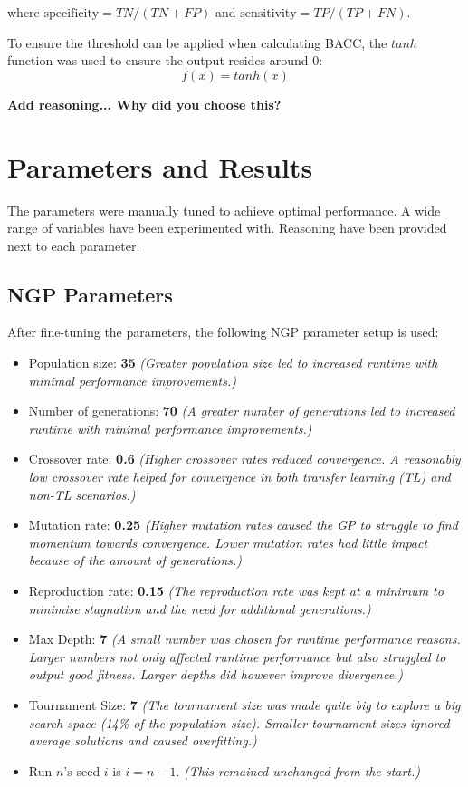 \documentclass{article}
\begin{document}
where \(\mbox{specificity} = TN / (TN + FP)\) and \(\mbox{sensitivity} = TP / (TP + FN)\).

To ensure the threshold can be applied when calculating BACC, the \(tanh\) function was used to ensure the output resides around 0:
\begin{equation}\label{eq:sigmoid}
  f(x) = tanh(x)
\end{equation}

\textbf{Add reasoning... Why did you choose this?}

\section{Parameters and Results}
\label{GPsetup}
The parameters were manually tuned to achieve optimal performance. A wide range of variables have been experimented with. Reasoning have been provided next to each parameter.

\subsection{NGP Parameters}
After fine-tuning the parameters, the following NGP parameter setup is used:
\begin{itemize}
  \item Population size: \textbf{35} \emph{(Greater population size led to increased runtime with minimal performance improvements.)}
  \item Number of generations: \textbf{70} \emph{(A greater number of generations led to increased runtime with minimal performance improvements.)}
  \item Crossover rate: \textbf{0.6} \emph{(Higher crossover rates reduced convergence. A reasonably low crossover rate helped for convergence in both transfer learning (TL) and non-TL scenarios.)}
  \item Mutation rate: \textbf{0.25} \emph{(Higher mutation rates caused the GP to struggle to find momentum towards convergence. Lower mutation rates had little impact because of the amount of generations.)}
  \item Reproduction rate: \textbf{0.15} \emph{(The reproduction rate was kept at a minimum to minimise stagnation and the need for additional generations.)}
  \item Max Depth: \textbf{7} \emph{(A small number was chosen for runtime performance reasons. Larger numbers not only affected runtime performance but also struggled to output good fitness. Larger depths did however improve divergence.)} 
  \item Tournament Size: \textbf{7} \emph{(The tournament size was made quite big to explore a big search space (14\% of the population size). Smaller tournament sizes ignored average solutions and caused overfitting.)}
  \item Run \(n\)'s seed \(i\) is \(i = n-1\). \emph{(This remained unchanged from the start.)}
\end{itemize}
\end{document}
